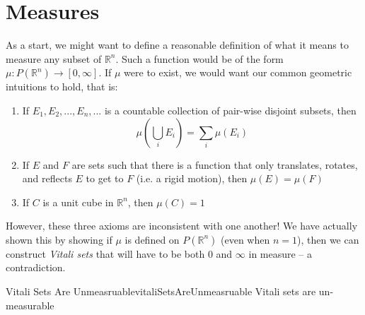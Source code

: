 \documentclass[oneside]{book}
\newcommand{\R}{\mathbb{R}}
\newcommand{\sse}{\subseteq}
\newcommand{\rw}{\rightarrow}
\begin{document}





\mainmatter
\chapter{Measures}

As a start, we might want to define a reasonable definition of what it means to measure any subset of $\R^n$. Such
a function would be of the form $\mu: P(\R^n) \rw [0, \infty]$. If $\mu$ were to exist, we would want our common
geometric intuitions to hold, that is:
\begin{enumerate}
	\item If $E_1, E_2, ..., E_n, ...$ is a countable collection of pair-wise disjoint subsets, then
		\[
			\mu \left(\bigcup_i E_i\right) = \sum_i \mu(E_i)
		\]
		\item If $E$ and $F$ are sets such that there is a function that only translates, rotates, and reflects $E$ to
			get to $F$ (i.e. a rigid motion), then $\mu(E) = \mu(F)$
		\item If $C$ is a unit cube in $\R^n$, then $\mu(C) = 1$
\end{enumerate}

However, these three axioms are inconsistent with one another! We have actually shown this by showing if $\mu$ is
defined on $P(\R^n)$ (even when $n = 1$), then we can construct \emph{Vitali sets} that will have to be both $0$ and
$\infty$ in measure -- a contradiction.

\begin{thm}{Vitali Sets Are Unmeasruable}{vitaliSetsAreUnmeasruable}
	Vitali sets are un-measurable
\end{thm}
\end{document}
